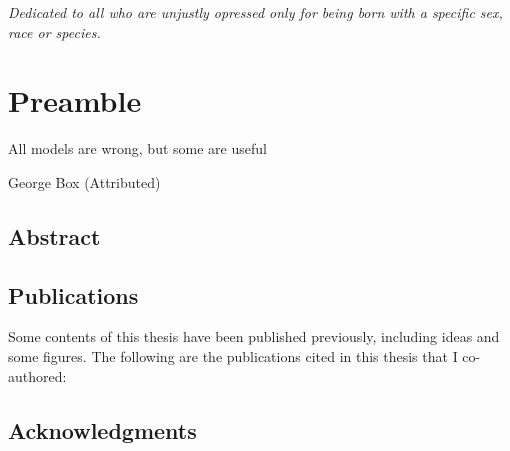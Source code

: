 \documentclass[
		twoside,openright,titlepage,numbers=noenddot,headinclude,%
	 	footinclude=true,cleardoublepage=empty,
		dottedtoc, %
		BCOR=5mm,paper=a4,fontsize=10pt, %
		ngerman,american, %
		]{scrreprt}
\begin{document}

\frenchspacing %
\raggedbottom %
\pagestyle{plain} %


\cleardoublepage
\vspace*{8cm}
\thispagestyle{empty}
\begin{center}
  \emph{Dedicated to all who are unjustly opressed only for being born with a specific sex, race or species.} 
\end{center}
\cleardoublepage
\chapter*{Preamble}
\label{sec:preamble}
\epigraph{All models are wrong, but some are useful}{George Box (Attributed)}
\section*{Abstract}
\label{sec:abstract}

\cleardoublepage
\section*{Publications}
\label{sec:publications}
Some contents of this thesis have been published previously, including ideas and some figures. The following are the publications cited in this thesis that I co-authored: \\ \vspace{1cm}
\printbibliography[heading=none,keyword={contribution}]
\cleardoublepage
\section*{Acknowledgments}
\label{sec:acks}

\cleardoublepage
{} 
\end{document}
